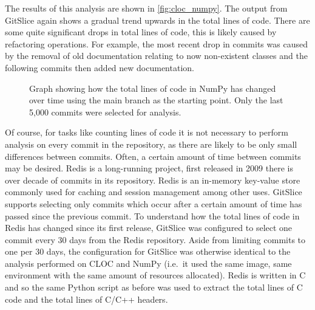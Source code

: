 The results of this analysis are shown in \autoref{fig:cloc_numpy}.
The output from GitSlice again shows a gradual trend upwards in the total lines of code.
There are some quite significant drops in total lines of code, this is likely caused by refactoring operations.
For example, the most recent drop in commits was caused by the removal of old documentation relating to now non-existent classes and the following commits then added new documentation.

\begin{figure}
    \centering
    \caption{Graph showing how the total lines of code in NumPy has changed over time using the main branch as the starting point.  Only the last 5,000 commits were selected for analysis.}
    \label{fig:cloc_numpy}
\end{figure}

Of course, for tasks like counting lines of code it is not necessary to perform analysis on every commit in the repository, as there are likely to be only small differences between commits.
Often, a certain amount of time between commits may be desired.
Redis is a long-running project, first released in 2009 there is over decade of commits in its repository.
Redis is an in-memory key-value store commonly used for caching and session management among other uses.
GitSlice supports selecting only commits which occur after a certain amount of time has passed since the previous commit.
To understand how the total lines of code in Redis has changed since its first release, GitSlice was configured to select one commit every 30 days from the Redis repository.
Aside from limiting commits to one per 30 days, the configuration for GitSlice was otherwise identical to the analysis performed on CLOC and NumPy (i.e.\ it used the same image, same environment with the same amount of resources allocated).
Redis is written in C and so the same Python script as before was used to extract the total lines of C code and the total lines of C/C++ headers.

